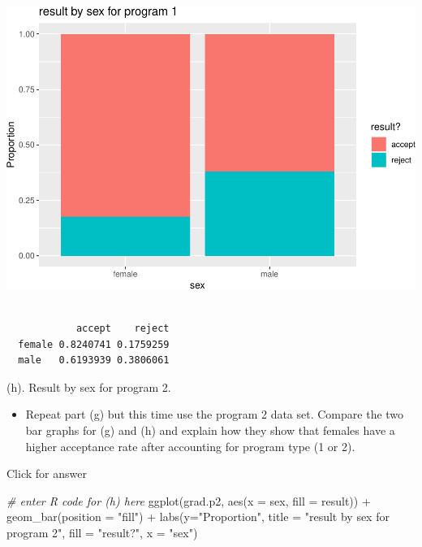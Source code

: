 \documentclass[
]{book}
\newenvironment{Shaded}{\begin{snugshade}}{\end{snugshade}}
\newcommand{\AttributeTok}[1]{\textcolor[rgb]{0.77,0.63,0.00}{#1}}
\newcommand{\CommentTok}[1]{\textcolor[rgb]{0.56,0.35,0.01}{\textit{#1}}}
\newcommand{\DecValTok}[1]{\textcolor[rgb]{0.00,0.00,0.81}{#1}}
\newcommand{\FunctionTok}[1]{\textcolor[rgb]{0.00,0.00,0.00}{#1}}
\newcommand{\NormalTok}[1]{#1}
\newcommand{\SpecialCharTok}[1]{\textcolor[rgb]{0.00,0.00,0.00}{#1}}
\newcommand{\StringTok}[1]{\textcolor[rgb]{0.31,0.60,0.02}{#1}}
\providecommand{\tightlist}{%
  \setlength{\itemsep}{0pt}\setlength{\parskip}{0pt}}
\begin{document}
\includegraphics[width=1\linewidth]{Class_Activity_4_files/figure-latex/unnamed-chunk-32-1}

\begin{Shaded}
\end{Shaded}

\begin{verbatim}
        
            accept    reject
  female 0.8240741 0.1759259
  male   0.6193939 0.3806061
\end{verbatim}

(h). Result by sex for program 2.

\begin{itemize}
\tightlist
\item
  Repeat part (g) but this time use the program 2 data set. Compare the two bar graphs for (g) and (h) and explain how they show that females have a higher acceptance rate after accounting for program type (1 or 2).
\end{itemize}

Click for answer

\begin{Shaded}
\begin{Highlighting}[]
\CommentTok{\# enter R code for (h) here}
\FunctionTok{ggplot}\NormalTok{(grad.p2, }\FunctionTok{aes}\NormalTok{(}\AttributeTok{x =}\NormalTok{ sex, }\AttributeTok{fill =}\NormalTok{ result)) }\SpecialCharTok{+}
 \FunctionTok{geom\_bar}\NormalTok{(}\AttributeTok{position =} \StringTok{"fill"}\NormalTok{) }\SpecialCharTok{+}
 \FunctionTok{labs}\NormalTok{(}\AttributeTok{y=}\StringTok{"Proportion"}\NormalTok{, }\AttributeTok{title =} \StringTok{"result by sex for program 2"}\NormalTok{,}
 \AttributeTok{fill =} \StringTok{"result?"}\NormalTok{, }\AttributeTok{x =} \StringTok{"sex"}\NormalTok{)}
\end{Highlighting}
\end{Shaded}
\end{document}
